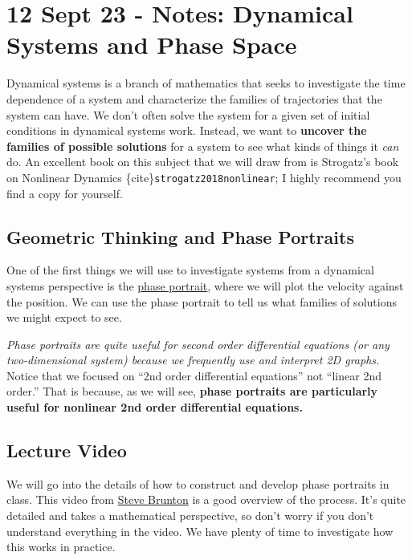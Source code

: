 \section{12 Sept 23 - Notes: Dynamical Systems and Phase
Space}\label{sept-23---notes-dynamical-systems-and-phase-space}

Dynamical systems is a branch of mathematics that seeks to investigate
the time dependence of a system and characterize the families of
trajectories that the system can have. We don't often solve the system
for a given set of initial conditions in dynamical systems work.
Instead, we want to \textbf{uncover the families of possible solutions}
for a system to see what kinds of things it \emph{can} do. An excellent
book on this subject that we will draw from is Strogatz's book on
Nonlinear Dynamics \{cite\}\texttt{strogatz2018nonlinear}; I highly
recommend you find a copy for yourself.

\subsection{Geometric Thinking and Phase
Portraits}\label{geometric-thinking-and-phase-portraits}

One of the first things we will use to investigate systems from a
dynamical systems perspective is the
\href{https://en.wikipedia.org/wiki/Phase_portrait}{phase portrait},
where we will plot the velocity against the position. We can use the
phase portrait to tell us what families of solutions we might expect to
see.

\emph{Phase portraits are quite useful for second order differential
equations (or any two-dimensional system) because we frequently use and
interpret 2D graphs.} Notice that we focused on ``2nd order differential
equations'' not ``linear 2nd order.'' That is because, as we will see,
\textbf{phase portraits are particularly useful for nonlinear 2nd order
differential equations.}

\subsection{Lecture Video}\label{lecture-video}

We will go into the details of how to construct and develop phase
portraits in class. This video from
\href{https://www.me.washington.edu/facultyfinder/steve-brunton}{Steve
Brunton} is a good overview of the process. It's quite detailed and
takes a mathematical perspective, so don't worry if you don't understand
everything in the video. We have plenty of time to investigate how this
works in practice.

